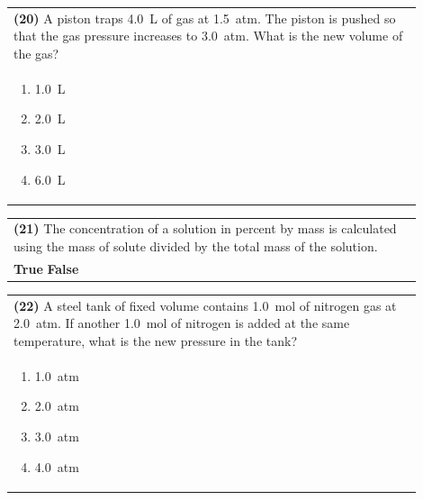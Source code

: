 \documentclass{article}
\begin{document}
\noindent\begin{tabular}{|p{0.9\linewidth}|}
\hline
\textbf{(20)} A piston traps 4.0~L of gas at 1.5~atm. The piston is pushed so that the gas pressure increases to 3.0~atm. What is the new volume of the gas?\\[0.2cm]
\begin{minipage}[t]{0.85\linewidth}
\begin{enumerate}[label=\alph*.]
\item 1.0~L
\item 2.0~L
\item 3.0~L
\item 6.0~L
\end{enumerate}
\end{minipage}\\[0.2cm]
\hline
\end{tabular}
\newpage

\vspace{0.2cm}
\noindent\begin{tabular}{|p{0.9\linewidth}|}
\hline
\textbf{(21)} The concentration of a solution in percent by mass is calculated using the mass of solute divided by the total mass of the solution.\\[0.2cm]
\textbf{True} \hspace{1cm} \textbf{False}\\[0.2cm]
\hline
\end{tabular}

\vspace{0.2cm}
\noindent\begin{tabular}{|p{0.9\linewidth}|}
\hline
\textbf{(22)} A steel tank of fixed volume contains 1.0~mol of nitrogen gas at 2.0~atm. If another 1.0~mol of nitrogen is added at the same temperature, what is the new pressure in the tank?\\[0.2cm]
\begin{minipage}[t]{0.85\linewidth}
\begin{enumerate}[label=\alph*.]
\item 1.0~atm
\item 2.0~atm
\item 3.0~atm
\item 4.0~atm
\end{enumerate}
\end{minipage}\\[0.2cm]
\hline
\end{tabular}
\end{document}
